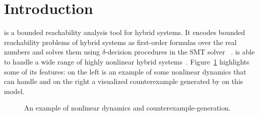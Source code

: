 \section{Introduction}\label{sec:intro}


\dReach{} is a bounded reachability analysis tool for hybrid systems.
It encodes bounded reachability problems of hybrid systems as
first-order formulas over the real numbers and solves them using
$\delta$-decision procedures in the SMT solver
\dReal{}~\cite{DBLP:conf/cade/GaoKC13}. \dReach{} is able to handle a
wide range of highly nonlinear hybrid
systems~\cite{CMSB14,DBLP:conf/fmcad/GaoKC13,DBLP:conf/hybrid/KapinskiDSA14,6868816}.
Figure~\ref{fig:prostate-example} highlights some of its features: on
the left is an example of some nonlinear dynamics that \dReach{} can
handle and on the right a visualized counterexample generated by
\dReach{} on this model.
\begin{figure}[!h]
  \hfill
  \caption{An example of nonlinear dynamics and counterexample-generation.}
  \label{fig:prostate-example}
\end{figure}

